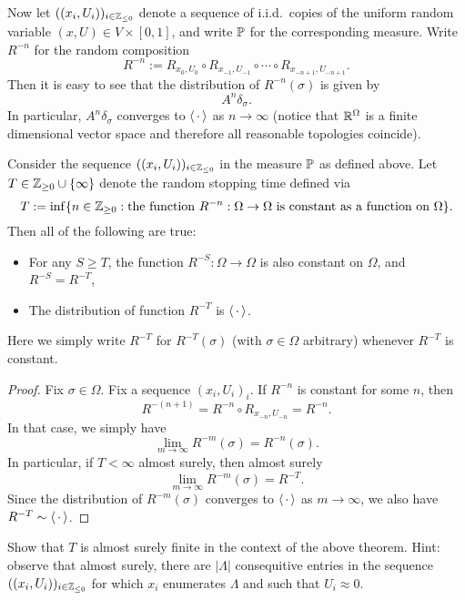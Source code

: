 Now let $((x_i,U_i))_{i\in\Z_{\leq 0}}$ denote a sequence of i.i.d.\ copies of
the uniform random variable $(x,U)\in V\times[0,1]$,
and write $\P$ for the corresponding measure.
Write $R^{-n}$ for the random composition
\[
    R^{-n}:=R_{x_0,U_0}\circ R_{x_{-1},U_{-1}}\circ\cdots\circ R_{x_{-n+1},U_{-n+1}}.
\]
Then it is easy to see that the distribution of $R^{-n}(\sigma)$
is given by
\[
    A^n\delta_\sigma.
\]
In particular, $A^n\delta_\sigma$ converges to $\langle\blank\rangle$ as $n\to\infty$
(notice that $\R^\Omega$ is a finite dimensional vector space and therefore all reasonable topologies coincide).

\begin{theorem}
    Consider the sequence $((x_i,U_i))_{i\in\Z_{\leq 0}}$ in the measure $\P$ as defined above.
    Let $T\in\Z_{\geq 0}\cup\{\infty\}$ denote the random stopping time
    defined via
    \[
        T:=\inf\{n\in\Z_{\geq 0}:\text{the function $R^{-n}:\Omega\to\Omega$ is constant as a function on $\Omega$}\}.
    \]
    Then all of the following are true:
    \begin{itemize}
        \item For any $S\geq T$, the function $R^{-S}:\Omega\to\Omega$ is also constant on $\Omega$, and $R^{-S}=R^{-T}$,
        \item The distribution of function $R^{-T}$ is $\langle\blank\rangle$.
    \end{itemize}
    Here we simply write $R^{-T}$ for $R^{-T}(\sigma)$ (with $\sigma\in\Omega$ arbitrary)
    whenever $R^{-T}$ is constant.
\end{theorem}

\begin{proof}
    Fix $\sigma\in\Omega$.
    Fix a sequence $(x_i,U_i)_i$.
    If $R^{-n}$ is constant for some $n$, then
    \[
            R^{-(n+1)}=R^{-n}\circ R_{x_{-n},U_{-n}}=R^{-n}.
    \]
    In that case, we simply have
    \[
        \lim_{m\to\infty}R^{-m}(\sigma)=R^{-n}(\sigma).
    \]
    In particular, if $T<\infty$ almost surely,
    then almost surely
    \[
        \lim_{m\to\infty} R^{-m}(\sigma)=R^{-T}.
    \]
    Since the distribution of $R^{-m}(\sigma)$ converges to $\langle\blank\rangle$
    as $m\to\infty$,
    we also have $R^{-T}\sim\langle\blank\rangle$.
\end{proof}

\begin{exercise}
    Show that $T$ is almost surely finite
    in the context of the above theorem.
    Hint: observe that almost surely,
    there are $|\Lambda|$ consequitive entries in the sequence $((x_i,U_i))_{i\in\Z_{\leq 0}}$
    for which $x_i$ enumerates $\Lambda$ and such that $U_i\approx 0$.
\end{exercise}

